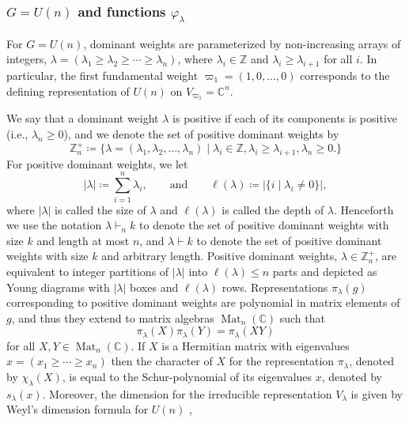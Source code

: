 \documentclass[pdflatex, sn-mathphys-num]{sn-jnl} %
\theoremstyle{plain}
\theoremstyle{definition}
\DeclareMathOperator{\Mat}{Mat}
\newcommand{\card}[1]{\left|#1\right|}
\newcommand{\undomweightsp}[1]{\mathbb Z^{+}_{#1}}
\newcommand{\vp}{\varphi} %
\newcommand{\ex}{x}
\newcommand{\yx}{\lambda}
\newcommand{\syx}{|\yx|}
\begin{document}
\subsubsection{\texorpdfstring{$G=U(n)$}{G=U(n)} and  functions \texorpdfstring{$\vp_\yx$}{philambda}}

For $G=U(n)$, dominant weights are parameterized by non-increasing arrays of integers, $\yx=(\yx_1 \geq \yx_2 \geq \cdots \geq \yx_n)$, where $\yx_i \in \mathbb Z$ and $\yx_i \geq \yx_{i+1}$ for all $i$.
In particular, the first fundamental weight $\varpi_1=(1, 0, \ldots, 0)$ corresponds to the defining representation of $U(n)$ on $V_{\varpi_1} = \mathbb{C}^n$.

We say that a dominant weight $\yx$ is positive if each of its components is positive (i.e., $\yx_n \geq 0$), and we denote the set of positive dominant weights by
\begin{equation}
    \undomweightsp{n} \coloneqq \{ \yx=(\yx_1, \yx_2, \ldots, \yx_n) \mid \yx_i \in \mathbb Z, \yx_i \geq \yx_{i+1}, \yx_n \geq 0. \}
\end{equation}
For positive dominant weights, we let
\begin{equation}
    \syx \coloneqq \sum_{i=1}^n \yx_i,
    \qquad
    \text{and}
    \qquad
    \ell(\yx) \coloneqq \card{\{i \mid \yx_i \neq 0\}},
\end{equation}
where $\syx$ is called the size of $\yx$ and $\ell(\yx)$ is called the depth of $\yx$.
Henceforth we use the notation $\yx \vdash_{n} k$ to denote the set of positive dominant weights with size $k$ and length at most $n$, and $\yx \vdash k$ to denote the set of positive dominant weights with size $k$ and arbitrary length.
Positive dominant weights, $\yx \in \undomweightsp{n}$, are equivalent to integer partitions of $\syx$ into $\ell(\yx) \leq n$ parts and depicted as Young diagrams with $\syx$ boxes and $\ell(\yx)$ rows.
Representations $\pi_\yx(g)$ corresponding to positive dominant weights are polynomial in matrix elements of $g$, and thus they extend to matrix algebras $\Mat_n(\mathbb{C})$ such that
\begin{equation}
    \pi_\yx(X) \pi_\yx(Y) = \pi_\yx(XY)
\end{equation}
for all $X,Y \in \Mat_n(\mathbb{C})$.
If $X$ is a Hermitian matrix with eigenvalues $\ex = (\ex_1 \geq \cdots \geq \ex_n)$ then the character of $X$ for the representation $\pi_{\yx}$, denoted by $\chi_{\yx}(X)$, is equal to the Schur-polynomial of its eigenvalues $\ex$, denoted by $s_{\yx}(\ex)$.
Moreover, the dimension for the irreducible representation $V_{\yx}$ is given by Weyl's dimension formula for $U(n)$ \cite{hall2008representations,itzykson1966unitary},
\end{document}
